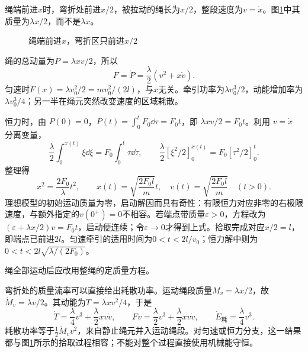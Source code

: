 \begin{solution}
绳端前进$x$时，弯折处前进$x/2$，被拉动的绳长为$x/2$，整段速度为$v=\dot x$。图\ref{fig:hw3-1-s}中其质量为$\lambda x/2$，而不是$\lambda x$。

\begin{figure}[H]\centering
{}
\caption{绳端前进$x$，弯折区只前进$x/2$}\label{fig:hw3-1-s}
\end{figure}

绳的总动量为$P=\lambda xv/2$，所以
\[
 F=\dot P=\frac\lambda2(v^2+x\dot v).
\]
匀速时$\boxed{F(x)=\lambda v_0^2/2=mv_0^2/(2l)}$，与$x$无关。牵引功率为$\lambda v_0^3/2$，动能增加率为$\lambda v_0^3/4$；另一半在绳元突然改变速度的区域耗散。

恒力时，由 $P(0)=0$，$P(t)=\int_0^t F_0\dd\tau=F_0t$，即 $\lambda xv/2=F_0t$。利用 $v=\dot x$ 分离变量，
\[
\frac\lambda2\int_0^{x(t)}\xi\dd\xi=F_0\int_0^t\tau\dd\tau,
\qquad \frac\lambda2[\xi^2/2]_0^{x(t)}=F_0[\tau^2/2]_0^t.
\]
整理得
\[
 x^2=\frac{2F_0}{\lambda}t^2,\qquad
 \boxed{x(t)=\sqrt{\frac{2F_0l}{m}}t,\quad
 v(t)=\sqrt{\frac{2F_0l}{m}}\quad(t>0)}.
\]
理想模型的初始运动质量为零，启动解因而具有奇性：有限恒力对应非零的右极限速度，与额外指定的$v(0^+)=0$不相容。若端点带质量$\varepsilon>0$，方程改为$(\varepsilon+\lambda x/2)v=F_0t$，启动便连续；令$\varepsilon\to0$才得到上式。拾取完成对应$x/2=l$，即端点已前进$2l$。匀速牵引的适用时间为$0<t<2l/v_0$；恒力解中则为$0<t<2l\sqrt{\lambda/(2F_0)}$。

绳全部运动后应改用整绳的定质量方程。


弯折处的质量流率可以直接给出耗散功率。运动绳段质量$M_v=\lambda x/2$，故$\dot M_v=\lambda v/2$。其动能为$T=\lambda xv^2/4$，于是
\[
 \dot T=\frac\lambda4v^3+\frac\lambda2xv\dot v,
 \qquad Fv=\frac\lambda2v^3+\frac\lambda2xv\dot v,
 \qquad \dot E_{\text{耗}}=\frac\lambda4v^3.
\]
耗散功率等于$\tfrac12\dot M_vv^2$，来自静止绳元并入运动绳段。对匀速或恒力分支，这一结果都与图\ref{fig:hw3-1-s}所示的拾取过程相容；不能对整个过程直接使用机械能守恒。

\end{solution}




